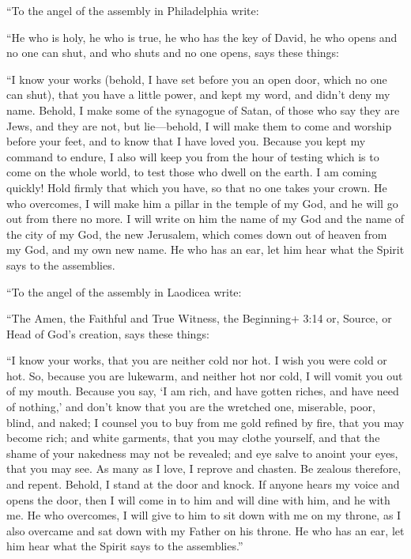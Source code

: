  ``To the angel of the assembly in Philadelphia write:

``He who is holy, he who is true, he who has the key of David, he who
opens and no one can shut, and who shuts and no one opens, says these
things:

 ``I know your works (behold, I have set before you an open
door, which no one can shut), that you have a little power, and kept my
word, and didn't deny my name.  Behold, I make some of the
synagogue of Satan, of those who say they are Jews, and they are not,
but lie---behold, I will make them to come and worship before your feet,
and to know that I have loved you.  Because you kept my
command to endure, I also will keep you from the hour of testing which
is to come on the whole world, to test those who dwell on the earth.
 I am coming quickly! Hold firmly that which you have, so
that no one takes your crown.  He who overcomes, I will
make him a pillar in the temple of my God, and he will go out from there
no more. I will write on him the name of my God and the name of the city
of my God, the new Jerusalem, which comes down out of heaven from my
God, and my own new name.  He who has an ear, let him hear
what the Spirit says to the assemblies.

 ``To the angel of the assembly in Laodicea write:

``The Amen, the Faithful and True Witness, the Beginning+ 3:14 or,
Source, or Head of God's creation, says these things:

 ``I know your works, that you are neither cold nor hot. I
wish you were cold or hot.  So, because you are lukewarm,
and neither hot nor cold, I will vomit you out of my mouth.
 Because you say, `I am rich, and have gotten riches, and
have need of nothing,' and don't know that you are the wretched one,
miserable, poor, blind, and naked;  I counsel you to buy
from me gold refined by fire, that you may become rich; and white
garments, that you may clothe yourself, and that the shame of your
nakedness may not be revealed; and eye salve to anoint your eyes, that
you may see.  As many as I love, I reprove and chasten. Be
zealous therefore, and repent.  Behold, I stand at the door
and knock. If anyone hears my voice and opens the door, then I will come
in to him and will dine with him, and he with me.  He who
overcomes, I will give to him to sit down with me on my throne, as I
also overcame and sat down with my Father on his throne. 
He who has an ear, let him hear what the Spirit says to the
assemblies.''

